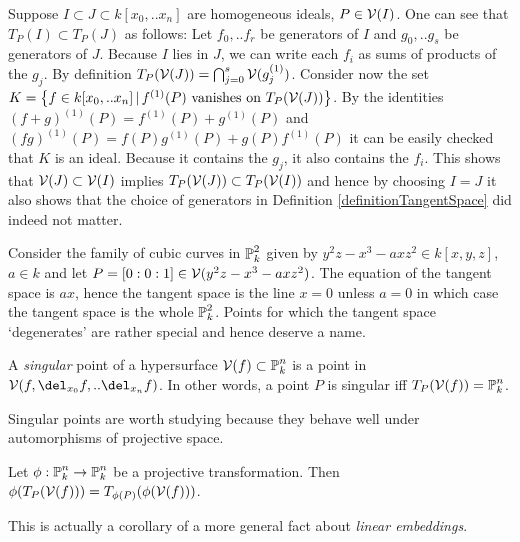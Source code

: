 \begin{example}
Suppose $I \subset J \subset k[x_0,..x_n]$ are homogeneous ideals, $P \in \operatorname{\mathcal V}(I)$.
One can see that $T_P(I) \subset T_P(J)$ as follows: Let $f_0,..f_r$ be generators of $I$ and $g_0,..g_s$ be generators of $J$.
Because $I$ lies in $J$, we can write each $f_i$ as sums of products of the $g_j$.
By definition $T_P(\operatorname{\mathcal V}(J)) = \bigcap_{j=0}^s \operatorname{\mathcal V}(g_j^{(1)})$.
Consider now the set $K = \left\lbrace f \in k[x_0,..x_n] \,|\, f^{(1)}(P) \text{ vanishes on }T_P(\operatorname{\mathcal V}(J))\right\rbrace$.
By the identities $(f+g)^{(1)}(P) = f^{(1)}(P) + g^{(1)}(P)$ and $(fg)^{(1)}(P) = f(P)g^{(1)}(P) + g(P)f^{(1)}(P)$ it can be easily checked that $K$ is an ideal.
Because it contains the $g_j$, it also contains the $f_i$.
This shows that $\operatorname{\mathcal V}(J) \subset \operatorname{\mathcal V}(I)$ implies $T_P(\operatorname{\mathcal V}(J)) \subset T_P(\operatorname{\mathcal V}(I))$ and hence by choosing $I=J$ it also shows that the choice of generators in Definition \ref{definitionTangentSpace} did indeed not matter.
\end{example}

\begin{example}
Consider the family of cubic curves in $\operatorname{\mathbb P}^2_k$ given by $y^2z - x^3 - axz^2 \in k[x,y,z]$, $a \in k$ and let $P = [0:0:1] \in \operatorname{\mathcal V}(y^2z - x^3 - axz^2)$.
The equation of the tangent space is $ax$, hence the tangent space is the line $x = 0$ unless $a = 0$ in which case the tangent space is the whole $\operatorname{\mathbb P}^2_k$.
Points for which the tangent space `degenerates' are rather special and hence deserve a name.
\end{example}


\begin{definition}
A \emph{singular} point of a hypersurface $\operatorname{\mathcal V}(f) \subset \operatorname{\mathbb P}^n_k$ is a point in $\V(f,\del_{x_0}f,..\del_{x_n}f)$.
In other words, a point $P$ is singular iff $T_P(\operatorname{\mathcal V}(f)) = \operatorname{\mathbb P}^n_k$.
\end{definition}

Singular points are worth studying because they behave well under automorphisms of projective space.

\begin{proposition} \label{propositionTangentTransform}
Let $\phi : \operatorname{\mathbb P}^n_k \to \operatorname{\mathbb P}^n_k$ be a projective transformation.
Then $\phi(T_P(\operatorname{\mathcal V}(f))) = T_{\phi(P)}(\phi(\operatorname{\mathcal V}(f)))$.
\end{proposition}

This is actually a corollary of a more general fact about \emph{linear embeddings}.

